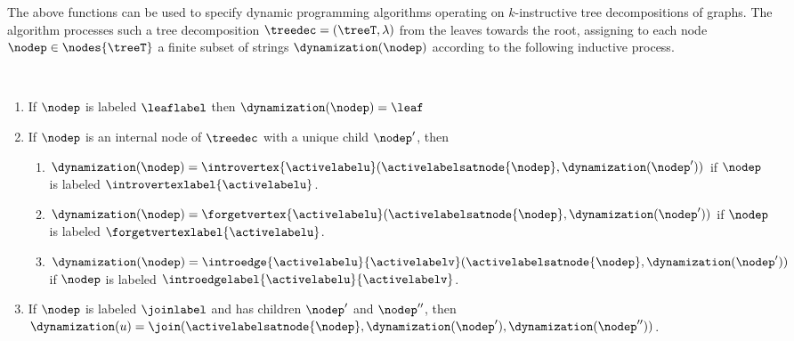 


The above functions can be used to specify dynamic programming algorithms operating on $k$-instructive tree decompositions of graphs. The algorithm processes such a tree decomposition $\treedec = (\treeT,\lambda)$ from the leaves towards the root, assigning to each node $\nodep\in \nodes{\treeT}$ a finite subset of strings $\dynamization(\nodep)$ according to the following inductive process. 

\begin{definition}[Dynamization]\label{Dynamization}
$ $
\begin{enumerate}
\item If $\nodep$ is labeled $\leaflabel$ then $\dynamization(\nodep) = \leaf$%
\item If $\nodep$ is an internal node of $\treedec$ with a unique child $\nodep'$, then 
\begin{enumerate}
    \item $\dynamization(\nodep) = \introvertex{\activelabelu}(\activelabelsatnode{\nodep},\dynamization(\nodep'))$ if $\nodep$ is labeled $\introvertexlabel{\activelabelu}$. 
    \item $\dynamization(\nodep) = \forgetvertex{\activelabelu}(\activelabelsatnode{\nodep},\dynamization(\nodep'))$ if $\nodep$ is labeled $\forgetvertexlabel{\activelabelu}$.
    \item $\dynamization(\nodep) = \introedge{\activelabelu}{\activelabelv}(\activelabelsatnode{\nodep},\dynamization(\nodep'))$ if $\nodep$ is labeled $\introedgelabel{\activelabelu}{\activelabelv}$. 
\end{enumerate}
\item If $\nodep$ is labeled $\joinlabel$ and has children $\nodep'$ and $\nodep''$, then $\dynamization(u) = \join(\activelabelsatnode{\nodep},\dynamization(\nodep'),\dynamization(\nodep''))$. 
\end{enumerate}
\end{definition}

